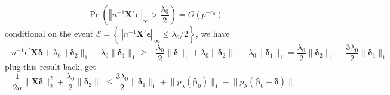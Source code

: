 \documentclass[twoside]{article}
\begin{document}
$$
\Pr \left( \left\Vert n^{-1}\mathbf{X}'\boldsymbol{\epsilon}  \right\Vert _{\infty} >\frac{\lambda_0}{2} \right) = O\left(p^{-c_0}\right)
$$
conditional on the event $\mathcal{E} = \left\{ \left\Vert n^{-1}\mathbf{X}'\boldsymbol{\epsilon}  \right\Vert _{\infty}\leq \lambda_0 /2 \right\}$, we have 
$$
 - n^{-1}\boldsymbol{\epsilon}^{\prime}\mathbf{X}\boldsymbol{\delta} + \lambda_0\lVert \boldsymbol{\delta}_2 \rVert _1 - \lambda_0 \lVert \boldsymbol{\delta}_1 \rVert _1 \geq -\frac{\lambda_0}{2}\lVert \boldsymbol{\delta} \rVert _1 + \lambda_0\lVert \boldsymbol{\delta}_2 \rVert _1 - \lambda_0 \lVert \boldsymbol{\delta}_1 \rVert _1 = \frac{\lambda_0}{2} \lVert \boldsymbol{\delta}_2 \rVert _1 - \frac{3\lambda_0}{2} \lVert \boldsymbol{\delta}_1 \rVert _1
$$
plug this result back, get
$$
\frac{1}{2n}\lVert \mathbf{X}\boldsymbol{\delta} \rVert ^2_2 + \frac{\lambda_0}{2} \lVert \boldsymbol{\delta}_2 \rVert _1 \leq \frac{3\lambda_0}{2} \lVert \boldsymbol{\delta}_1 \rVert _1+ \lVert p_{\lambda}({\boldsymbol{\beta}_0}) \rVert _1 -  \lVert p_{\lambda}( \boldsymbol{\beta}_0+\boldsymbol{\delta}) \rVert _1 
$$

\newpage


\end{document}
